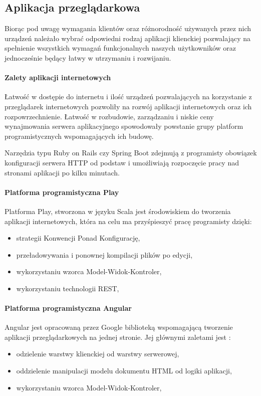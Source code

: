 \documentclass[a4paper,12pt,twoside]{article}
\begin{document}
\subsection{Aplikacja przeglądarkowa}
Biorąc pod uwagę wymagania klientów oraz różnorodność używanych przez nich urządzeń należało wybrać odpowiedni rodzaj aplikacji klienckiej pozwalający na spełnienie wszystkich wymagań funkcjonalnych naszych użytkowników 
oraz jednocześnie będący łatwy w utrzymaniu i rozwijaniu.

\paragraph{Zalety aplikacji internetowych}
Łatwość w dostępie do internetu i ilość urządzeń pozwalających na 
korzystanie z przeglądarek internetowych pozwoliły 
na rozwój aplikacji internetowych oraz ich rozpowrzechnienie.
Łatwość w rozbudowie, zarządzaniu i 
niskie ceny wynajmowania serwera aplikacyjnego spowodowały 
powstanie grupy platform programistycznych wspomagających ich budowę. 

Narzędzia typu Ruby on Rails czy Spring Boot 
zdejmują z programisty obowiązek konfiguracji serwera 
HTTP od podstaw i umożliwiają rozpoczęcie pracy  
nad stronami aplikacji po kilku minutach.

\paragraph{Platforma programistyczna Play}
Platforma Play, stworzona w języku Scala jest środowiskiem 
do tworzenia aplikacji internetowych, 
która na celu ma przyśpieszyć pracę programisty dzięki:
\begin{itemize}
\item strategii Konwencji Ponad Konfigurację,
\item przeładowywania i ponownej kompilacji plików po edycji,
\item wykorzystaniu wzorca Model-Widok-Kontroler,
\item wykorzystaniu technologii REST,
\end{itemize} 
  
\paragraph{Platforma programistyczna Angular}
Angular jest opracowaną przez Google biblioteką wspomagającą tworzenie 
aplikacji przeglądarkowych na jednej stronie. Jej głównymi zaletami jest :
\begin{itemize}
\item odzielenie warstwy klienckiej od warstwy serwerowej,
\item oddzielenie manipulacji modelu dokumentu HTML od logiki aplikacji,
\item wykorzystaniu wzorca Model-Widok-Kontroler,
\end{itemize} 
    
\end{document}
